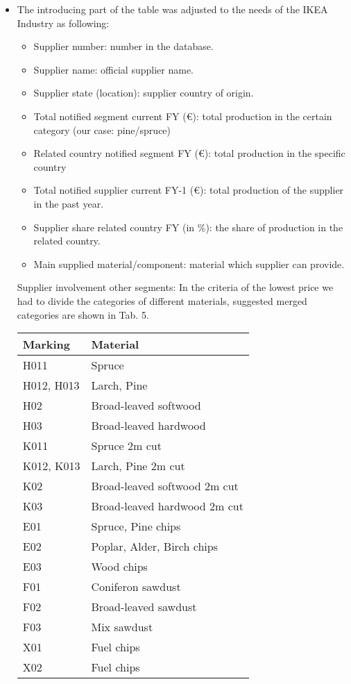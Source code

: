 \documentclass[oneside,12pt]{article}%
\begin{document}
\begin{itemize}
  \item The introducing part of the table was adjusted to the needs of the IKEA Industry as following:

    \begin{itemize}
      \item Supplier number: number in the database.
      \item Supplier name: official supplier name.
      \item Supplier state (location): supplier country of origin.
      \item Total notified segment current FY (\euro): total production in the certain category (our case: pine/spruce)
      \item Related country notified segment FY (\euro): total production in the specific country
      \item Total notified supplier current FY-1 (\euro): total production of the supplier in the past year.
      \item Supplier share related country FY (in \%): the share of production in the related country.
      \item Main supplied material/component: material which supplier can provide.
    \end{itemize}
    Supplier involvement other segments:
    In the criteria of the lowest price we had to divide the categories of different materials, suggested merged categories are shown in Tab. 5.


    \begin{table}[h]
      \tiny
      \begin{tabular}{l|l}
        Marking    & Material                     \\ \hline
        H011       & Spruce                       \\
        H012, H013 & Larch, Pine                  \\
        H02        & Broad-leaved softwood        \\
        H03        & Broad-leaved hardwood        \\
        K011       & Spruce 2m cut                \\
        K012, K013 & Larch, Pine 2m cut           \\
        K02        & Broad-leaved softwood 2m cut \\
        K03        & Broad-leaved hardwood 2m cut \\
        E01        & Spruce, Pine chips           \\
        E02        & Poplar, Alder, Birch chips   \\
        E03        & Wood chips                   \\
        F01        & Coniferon sawdust            \\
        F02        & Broad-leaved sawdust         \\
        F03        & Mix sawdust                  \\
        X01        & Fuel chips                   \\
        X02        & Fuel chips
      \end{tabular}
    \end{table}



\end{itemize}
\end{document}
